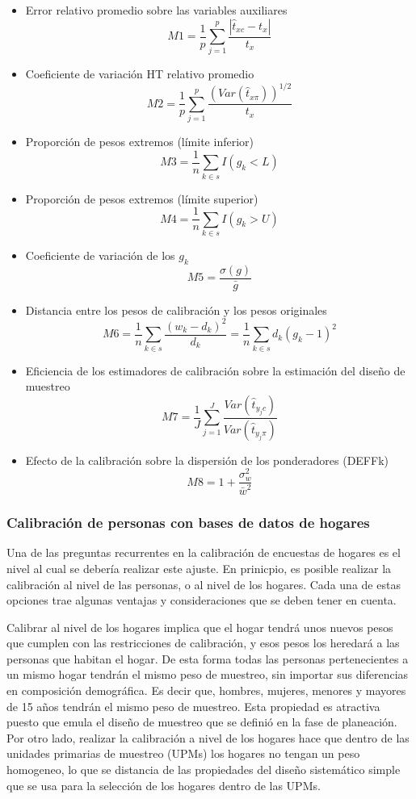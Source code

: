 \begin{itemize}
\item
  Error relativo promedio sobre las variables auxiliares
  \[
  M1= \frac{1}{p} \sum_{j=1}^p \frac{|\hat{t}_{xc} - t_x|}{t_x}
  \]
\item
  Coeficiente de variación HT relativo promedio
  \[M2= \frac{1}{p} \sum_{j=1}^p \frac{(Var(\hat{t}_{x\pi}))^{1/2}}{t_x} \]
\item
  Proporción de pesos extremos (límite inferior)
  \[M3 = \frac{1}{n} \sum_{k \in s}I(g_k<L)\]
\item
  Proporción de pesos extremos (límite superior)
  \[M4= \frac{1}{n} \sum_{k \in s}I(g_k>U)\]
\item
  Coeficiente de variación de los \(g_k\)
  \[M5= \frac{\sigma(g)}{\bar{g}}\]
\item
  Distancia entre los pesos de calibración y los pesos originales
  \[M6 = \frac{1}{n}\sum_{k \in s} \frac{(w_k - d_k)^2}{d_k}
  = \frac{1}{n}\sum_{k \in s} d_k(g_k - 1)^2\]
\item
  Eficiencia de los estimadores de calibración sobre la estimación del diseño de muestreo
  \[M7 = \frac{1}{J}\sum_{j=1}^J \frac{Var(\hat{t}_{y_jc})}{Var(\hat{t}_{y_j\pi})} \]
\item
  Efecto de la calibración sobre la dispersión de los ponderadores (DEFFk)
  \[M8 = 1+\frac{\sigma^2_w}{\bar{w}^2}\]
\end{itemize}

\hypertarget{calibracion-de-personas-con-bases-de-datos-de-hogares}{%
\subsubsection*{Calibración de personas con bases de datos de hogares}\label{calibracion-de-personas-con-bases-de-datos-de-hogares}}


Una de las preguntas recurrentes en la calibración de encuestas de hogares es el nivel al cual se debería realizar este ajuste. En prinicpio, es posible realizar la calibración al nivel de las personas, o al nivel de los hogares. Cada una de estas opciones trae algunas ventajas y consideraciones que se deben tener en cuenta.

Calibrar al nivel de los hogares implica que el hogar tendrá unos nuevos pesos que cumplen con las restricciones de calibración, y esos pesos los heredará a las personas que habitan el hogar. De esta forma todas las personas pertenecientes a un mismo hogar tendrán el mismo peso de muestreo, sin importar sus diferencias en composición demográfica. Es decir que, hombres, mujeres, menores y mayores de 15 años tendrán el mismo peso de muestreo. Esta propiedad es atractiva puesto que emula el diseño de muestreo que se definió en la fase de planeación. Por otro lado, realizar la calibración a nivel de los hogares hace que dentro de las unidades primarias de muestreo (UPMs) los hogares no tengan un peso homogeneo, lo que se distancia de las propiedades del diseño sistemático simple que se usa para la selección de los hogares dentro de las UPMs.

